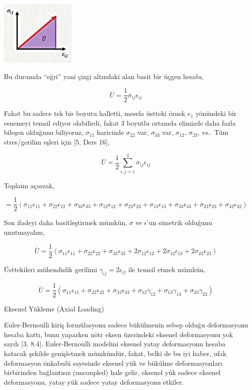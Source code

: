 \documentclass[12pt,fleqn]{article}\usepackage{../../common}
\begin{document}
\includegraphics[width=10em]{phy_020_strs_04_05.jpg}

Bu durumda ``eğri'' yani çizgi altındaki alan basit bir üçgen hesabı,

$$
\overline{U} = \frac{1}{2} \sigma_{ij} \epsilon_{ij}
$$

Fakat bu sadece tek bir boyutu halletti, mesela üstteki örnek $e_1$ yönündeki
bir esnemeyi temsil ediyor olabilirdi, fakat 3 boyutlu ortamda elimizde daha
fazla bileşen olduğunu biliyoruz, $\sigma_{11}$ haricinde $\sigma_{22}$ var,
$\sigma_{33}$ var, $\sigma_{12}$, $\sigma_{23}$, vs.. Tüm stres/gerilim
eşleri için [5, Ders 16],

$$
\overline{U} = \frac{1}{2} \sum_{i,j=1}^{3} \sigma_{ij} \epsilon_{ij}
$$

Toplamı açarsak,

$$
= \frac{1}{2} (\sigma_{11}\epsilon_{11} + \sigma_{22}\epsilon_{22}  +
\sigma_{33}\epsilon_{33} + \sigma_{12}\epsilon_{12} + \sigma_{23}\epsilon_{23} +
\sigma_{13}\epsilon_{13} + \sigma_{33}\epsilon_{33} + \sigma_{23}\epsilon_{23} +
\sigma_{32}\epsilon_{32} )
$$

Son ifadeyi daha basitleştirmek mümkün, $\sigma$ ve $\epsilon$'un simetrik
olduğunu unutmayalım,

$$
\overline{U} = \frac{1}{2} (\sigma_{11}\epsilon_{11} + \sigma_{22}\epsilon_{22}  +
\sigma_{33}\epsilon_{33} + 2 \sigma_{12}\epsilon_{12} +
2 \sigma_{13}\epsilon_{13} + 2 \sigma_{23}\epsilon_{23} )
$$

Üsttekileri mühendislik gerilimi $\gamma_{ij} = 2 \epsilon_{ij}$ ile temsil
etmek mümkün,

$$
\overline{U} = \frac{1}{2} (\sigma_{11}\epsilon_{11} + \sigma_{22}\epsilon_{22}  +
\sigma_{33}\epsilon_{33} + \sigma_{12}\gamma_{12} +
\sigma_{13}\gamma_{13} + \sigma_{23}\gamma_{23} )
$$
 
Eksenel Yükleme (Axial Loading)

Euler-Bernoulli kiriş formülasyonu sadece bükülmenin sebep olduğu deformasyonu
hesaba kattı, bunu yaparken nötr eksen üzerindeki eksenel deformasyonu yok saydı
[3, 8.4]. Euler-Bernoulli modelini eksenel yatay deformasyonu hesaba katacak
şekilde genişletmek mümkündür, fakat, belki de bu iyi haber, ufak deformasyon
önkabulü sayesinde eksenel yük ve bükülme deformasyonları birbirinden
bağlantısız (uncoupled) hale gelir, eksenel yük sadece eksenel deformasyonu,
yatay yük sadece yatay deformasyonu etkiler.
\end{document}
